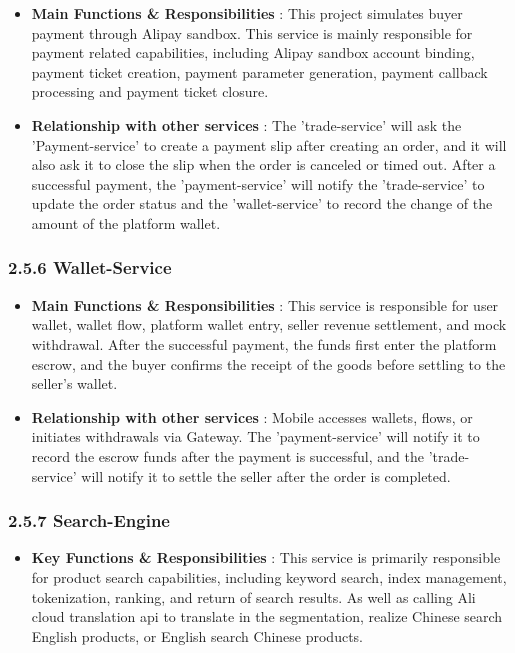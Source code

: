 \documentclass{article}
\begin{document}
\begin{itemize}
    \item \textbf{ Main Functions \& Responsibilities } : This project simulates buyer payment through Alipay sandbox. This service is mainly responsible for payment related capabilities, including Alipay sandbox account binding, payment ticket creation, payment parameter generation, payment callback processing and payment ticket closure.
    \item \textbf{ Relationship with other services } : The 'trade-service' will ask the 'Payment-service' to create a payment slip after creating an order, and it will also ask it to close the slip when the order is canceled or timed out. After a successful payment, the 'payment-service' will notify the 'trade-service' to update the order status and the 'wallet-service' to record the change of the amount of the platform wallet.
\end{itemize}

\subsubsection{2.5.6 Wallet-Service}

\begin{itemize}
    \item \textbf{ Main Functions \& Responsibilities } : This service is responsible for user wallet, wallet flow, platform wallet entry, seller revenue settlement, and mock withdrawal. After the successful payment, the funds first enter the platform escrow, and the buyer confirms the receipt of the goods before settling to the seller's wallet.
    \item \textbf{ Relationship with other services } : Mobile accesses wallets, flows, or initiates withdrawals via Gateway. The 'payment-service' will notify it to record the escrow funds after the payment is successful, and the 'trade-service' will notify it to settle the seller after the order is completed.
\end{itemize}

\subsubsection{2.5.7 Search-Engine}

\begin{itemize}
    \item \textbf{ Key Functions \& Responsibilities } : This service is primarily responsible for product search capabilities, including keyword search, index management, tokenization, ranking, and return of search results. As well as calling Ali cloud translation api to translate in the segmentation, realize Chinese search English products, or English search Chinese products.
\end{itemize}
\end{document}
